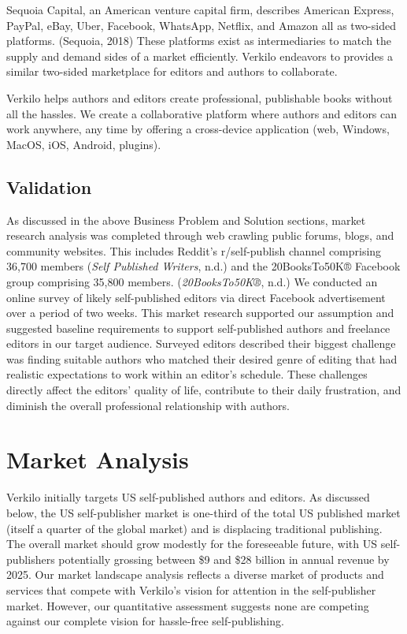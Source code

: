 \documentclass[10pt,openany]{book}
\begin{document}
Sequoia Capital, an American venture capital firm, describes American
Express, PayPal, eBay, Uber, Facebook, WhatsApp, Netflix, and Amazon all
as two-sided platforms. (Sequoia, 2018) These platforms exist as
intermediaries to match the supply and demand sides of a market
efficiently. Verkilo endeavors to provides a similar two-sided
marketplace for editors and authors to collaborate.

Verkilo helps authors and editors create professional, publishable books
without all the hassles. We create a collaborative platform where
authors and editors can work anywhere, any time by offering a
cross-device application (web, Windows, MacOS, iOS, Android, plugins).

\hypertarget{validation}{%
\section{Validation}\label{validation}}

As discussed in the above Business Problem and Solution sections, market
research analysis was completed through web crawling public forums,
blogs, and community websites. This includes Reddit's r/self-publish
channel comprising 36,700 members (\emph{Self Published Writers}, n.d.)
and the 20BooksTo50K® Facebook group comprising 35,800 members.
(\emph{20BooksTo50K®}, n.d.) We conducted an online survey of likely
self-published editors via direct Facebook advertisement over a period
of two weeks. This market research supported our assumption and
suggested baseline requirements to support self-published authors and
freelance editors in our target audience. Surveyed editors described
their biggest challenge was finding suitable authors who matched their
desired genre of editing that had realistic expectations to work within
an editor's schedule. These challenges directly affect the editors'
quality of life, contribute to their daily frustration, and diminish the
overall professional relationship with authors.

\hypertarget{market-analysis}{%
\chapter{Market Analysis}\label{market-analysis}}

Verkilo initially targets US self-published authors and editors. As
discussed below, the US self-publisher market is one-third of the total
US published market (itself a quarter of the global market) and is
displacing traditional publishing. The overall market should grow
modestly for the foreseeable future, with US self-publishers potentially
grossing between \$9 and \$28 billion in annual revenue by 2025. Our
market landscape analysis reflects a diverse market of products and
services that compete with Verkilo's vision for attention in the
self-publisher market. However, our quantitative assessment suggests
none are competing against our complete vision for hassle-free
self-publishing.
\end{document}
